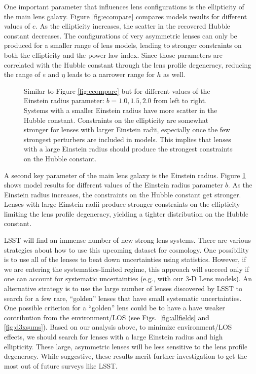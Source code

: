 \documentclass{emulateapj}
\begin{document}
One important parameter that influences lens configurations is the ellipticity of the main lens galaxy.  Figure \ref{fig:ecompare} compares models results for different values of $e$.  As the ellipticity increases, the scatter in the recovered Hubble constant decreases. The configurations of very asymmetric lenses can only be produced for a smaller range of lens models, leading to stronger constraints on both the ellipticity and the power law index.  Since those parameters are correlated with the Hubble constant through the lens profile degeneracy, reducing the range of $e$ and $\eta$ leads to a narrower range for $h$ as well.

\begin{figure}[t]
\begin{center}
\caption{\label{fig:recompare} Similar to Figure \ref{fig:ecompare} but for different values of the Einstein radius parameter: $b = 1.0,1.5,2.0$ from left to right. Systems with a smaller Einstein radius have more scatter in the Hubble constant. Constraints on the ellipticity are somewhat stronger for lenses with larger Einstein radii, especially once the few strongest perturbers are included in models. This implies that lenses with a large Einstein radius should produce the strongest constraints on the Hubble constant.%
}
\end{center}
\end{figure}

A second key parameter of the main lens galaxy is the Einstein radius. Figure \ref{fig:recompare} shows model results for different values of the Einstein radius parameter $b$.  As the Einstein radius increases, the constraints on the Hubble constant get stronger. Lenses with large Einstein radii produce stronger constraints on the ellipticity limiting the lens profile degeneracy, yielding a tighter distribution on the Hubble constant.
  
LSST will find an immense number of new strong lens systems. There are various strategies about how to use this upcoming dataset for cosmology. One possibility is to use all of the lenses to beat down  uncertainties using statistics. However, if we are entering the systematics-limited regime, this approach will succeed only if one can account for systematic uncertainties (e.g., with our 3-D Lens models). An alternative strategy is to use the large number of lenses discovered by LSST to search for a few rare, ``golden'' lenses that have small systematic uncertainties. One possible criterion for a ``golden'' lens could be to have a have weaker contribution from the environment/LOS (see Figs.\ \ref{fig:allfields} and \ref{fig:d3xsums}). Based on our analysis above, to minimize environment/LOS effects, we should search for lenses with a large Einstein radius and high ellipticity. These large, asymmetric lenses will be less sensitive to the lens profile degeneracy. While suggestive, these results merit further investigation to get the most out of future surveys like LSST.
  
\end{document}
